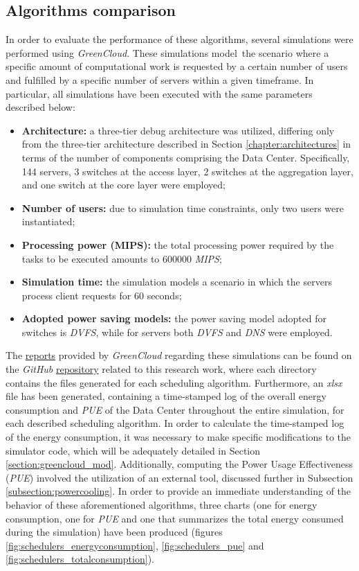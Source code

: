 \subsection{Algorithms comparison}
In order to evaluate the performance of these algorithms, several simulations were performed using \emph{GreenCloud}. These simulations model\ the scenario where a specific amount of computational work is requested by a certain number of users and fulfilled by a specific number of servers within a given timeframe. In particular, all simulations have been executed with the same parameters described below:
\begin{itemize}
    \item \textbf{Architecture:} a three-tier debug architecture was utilized, differing only from the three-tier architecture described in Section \ref{chapter:architectures} in terms of the number of components comprising the Data Center. Specifically, 144 servers, 3 switches at the access layer, 2 switches at the aggregation layer, and one switch at the core layer were employed;
    \item \textbf{Number of users:} due to simulation time constraints, only two users were instantiated;
    \item \textbf{Processing power (MIPS):} the total processing power required by the tasks to be executed amounts to 600000 \emph{MIPS};
    \item \textbf{Simulation time:} the simulation models a scenario in which the servers process client requests for 60 seconds;
    \item \textbf{Adopted power saving models:} the power saving model adopted for switches is \emph{DVFS}, while for servers both \emph{DVFS} and \emph{DNS} were employed.
\end{itemize}
The \href{https://github.com/vincenzo-emanuele/masters-degree-thesis/tree/main/scheduling\_algorithms\_comparison/simulations}{reports} provided by \emph{GreenCloud} regarding these simulations can be found on the \emph{GitHub} \href{https://github.com/vincenzo-emanuele/masters-degree-thesis}{repository} related to this research work, where each directory contains the files generated for each scheduling algorithm. Furthermore, an \emph{xlsx} file has been generated, containing a time-stamped log of the overall energy consumption and \emph{PUE} of the Data Center throughout the entire simulation, for each described scheduling algorithm. In order to calculate the time-stamped log of the energy consumption, it was necessary to make specific modifications to the simulator code, which will be adequately detailed in Section \ref{section:greencloud_mod}. Additionally, computing the Power Usage Effectiveness (\emph{PUE}) involved the utilization of an external tool, discussed further in Subsection \ref{subsection:powercooling}. In order to provide an immediate understanding of the behavior of these aforementioned algorithms, three charts (one for energy consumption, one for \emph{PUE} and one that summarizes the total energy consumed during the simulation) have been produced (figures \ref{fig:schedulers_energyconsumption}, \ref{fig:schedulers_pue} and \ref{fig:schedulers_totalconsumption}). \\
